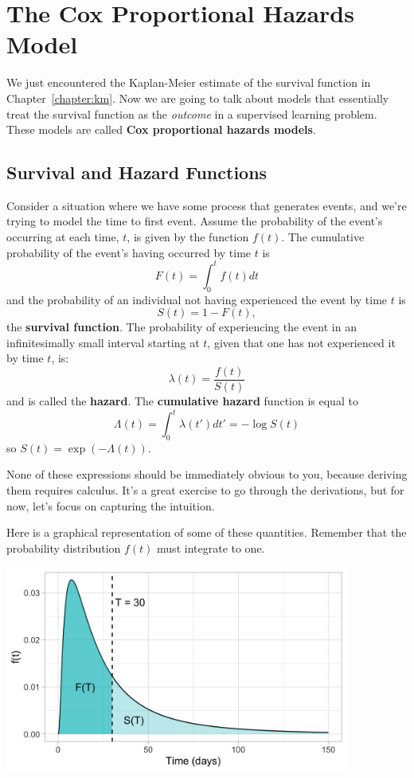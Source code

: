 \chapter{The Cox Proportional Hazards Model \label{chapter:cox}}

We just encountered the Kaplan-Meier estimate of the survival function in Chapter~\ref{chapter:km}. Now we are going to talk about models that essentially treat the survival function as the \emph{outcome} in a supervised learning problem. These models are called \textbf{Cox proportional hazards models}.


\section{Survival and Hazard Functions}

Consider a situation where we have some process that generates events, and we're trying to model the time to first event. Assume the probability of the event's occurring at each time, $t$, is given by the function $f(t)$. The cumulative probability of the event's having occurred by time $t$ is
$$ F(t) = \int_0^t f(t) dt$$
and the probability of an individual not having experienced the event by time $t$ is
$$ S(t) = 1 - F(t), $$
the \textbf{survival function}. The probability of experiencing the event in an infinitesimally small interval starting at $t$, given that one has not experienced it by time $t$, is:
$$ \lambda(t) = \frac{f(t)}{S(t)} $$
and is called the \textbf{hazard}. The \textbf{cumulative hazard} function is equal to
$$ \Lambda(t) = \int_0^t \lambda(t') dt' = -\log S(t) $$
so $S(t) = \exp(-\Lambda(t))$. 

None of these expressions should be immediately obvious to you, because deriving them requires calculus. It's a great exercise to go through the derivations, but for now, let's focus on capturing the intuition.

Here is a graphical representation of some of these quantities. Remember that the probability distribution $f(t)$ must integrate to one.

\begin{center}
\includegraphics[width=0.85\textwidth]{img/survival-function-example-fx.png}
\end{center}


